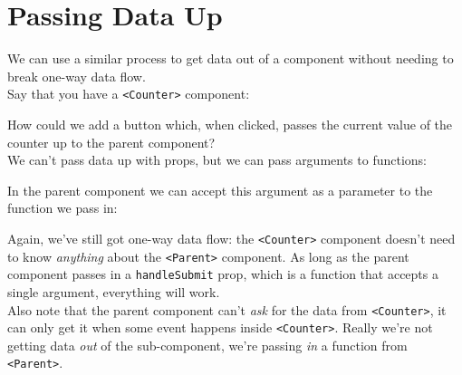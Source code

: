 \section{Passing Data Up}

We can use a similar process to get data out of a component without needing to break one-way data flow.
\\

Say that you have a \texttt{<Counter>} component:


How could we add a button which, when clicked, passes the current value of the counter up to the parent component?
\\

We can't pass data up with props, but we can pass arguments to functions:


In the parent component we can accept this argument as a parameter to the function we pass in:


Again, we've still got one-way data flow: the \texttt{<Counter>} component doesn't need to know \textit{anything} about the \texttt{<Parent>} component. As long as the parent component passes in a \texttt{handleSubmit} prop, which is a function that accepts a single argument, everything will work.
\\

Also note that the parent component can't \textit{ask} for the data from \texttt{<Counter>}, it can only get it when some event happens inside \texttt{<Counter>}. Really we're not getting data \textit{out} of the sub-component, we're passing \textit{in} a function from \texttt{<Parent>}.
